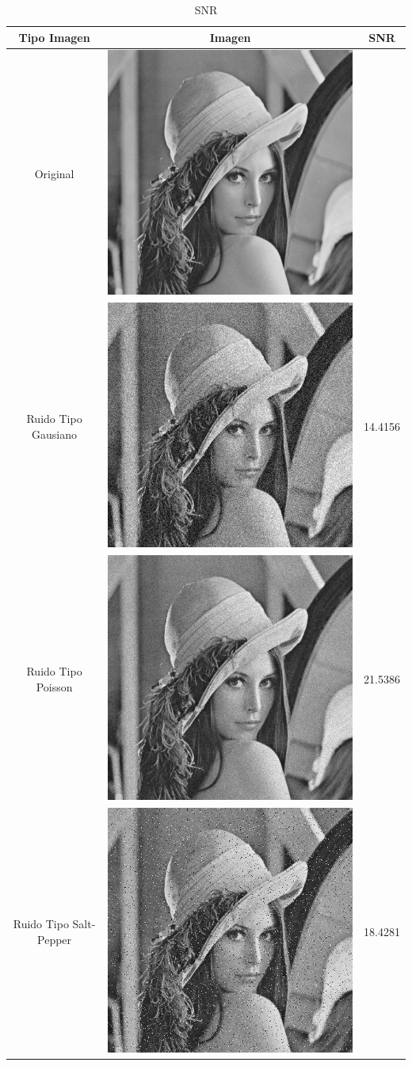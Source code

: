 \documentclass[10pt, a4paper, spanish]{article}  	%
\begin{document}
\begin{table}[h!]
\caption{SNR}
\begin{tabular}{|c|c|c|}
\hline
Tipo Imagen & Imagen & SNR \\
\hline
Original & 	\includegraphics[width=0.25\linewidth]{lenaGray} & \\ 
\hline
Ruido Tipo Gausiano & 	\includegraphics[width=0.25\linewidth]{lenaNoiseGaussian} & 14.4156 \\
\hline
Ruido Tipo Poisson & 	\includegraphics[width=0.25\linewidth]{lenaNoisePoisson} & 21.5386\\
\hline
Ruido Tipo Salt-Pepper & 	\includegraphics[width=0.25\linewidth]{lenaNoiseSP} & 18.4281\\

\hline
\end{tabular}
\label{default}
\end{table}
\end{document}
